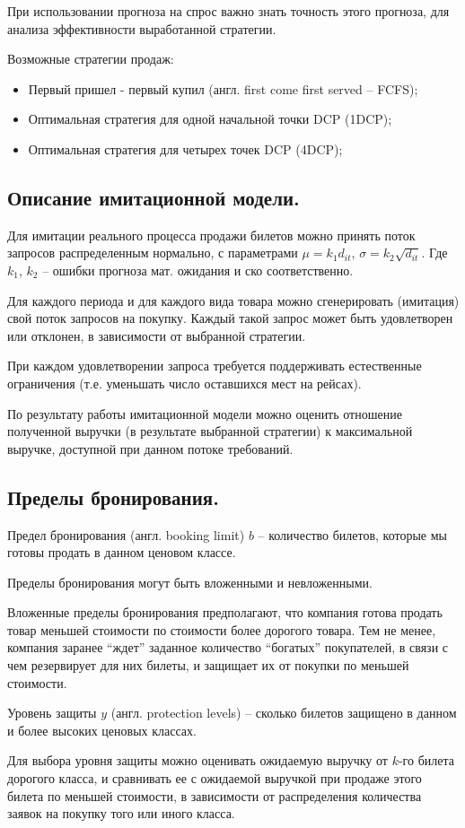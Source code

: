 \documentclass[reqno]{article}
\theoremstyle{definition}
\theoremstyle{definition}
\theoremstyle{definition}
\theoremstyle{definition}
\theoremstyle{definition}
\theoremstyle{definition}
\theoremstyle{definition}
\theoremstyle{definition}
\theoremstyle{definition}
\begin{document}
		При использовании прогноза на спрос важно знать точность этого прогноза, для анализа эффективности выработанной стратегии.
		
		Возможные стратегии продаж:
		\begin{itemize}
			\item Первый пришел - первый купил (англ. first come first served -- FCFS);
			\item Оптимальная стратегия для одной начальной точки DCP (1DCP);
			\item Оптимальная стратегия для четырех точек DCP (4DCP);
		\end{itemize}
	
	
		\subsection{Описание имитационной модели.}
		
		
		Для имитации реального процесса продажи билетов можно принять поток запросов распределенным нормально, с параметрами $\mu = k_1 d_{i t}$, $\sigma = k_2 \sqrt{d_{i t}}$. Где $k_1$, $k_2$ -- ошибки прогноза мат. ожидания и ско соответственно.
		
		Для каждого периода и для каждого вида товара можно сгенерировать (имитация) свой поток запросов на покупку. Каждый такой запрос может быть удовлетворен или отклонен, в зависимости от выбранной стратегии.
		
		При каждом удовлетворении запроса требуется поддерживать естественные ограничения (т.е. уменьшать число оставшихся мест на рейсах).
		
		По результату работы имитационной модели можно оценить отношение полученной выручки (в результате выбранной стратегии) к максимальной выручке, доступной при данном потоке требований.
		
		
		\subsection{Пределы бронирования.}
		
		Предел бронирования (англ. booking limit) $b$ -- количество билетов, которые мы готовы продать в данном ценовом классе.
		
		Пределы бронирования могут быть вложенными и невложенными.
		
		Вложенные пределы бронирования предполагают, что компания готова продать товар меньшей стоимости по стоимости более дорогого товара. Тем не менее, компания заранее ``ждет'' заданное количество ``богатых'' покупателей, в связи с чем резервирует для них билеты, и защищает их от покупки по меньшей стоимости.
		
		Уровень защиты $y$ (англ. protection levels) -- сколько билетов защищено в данном и более высоких ценовых классах.
		
		Для выбора уровня защиты можно оценивать ожидаемую выручку от $k$-го билета дорогого класса, и сравнивать ее с ожидаемой выручкой при продаже этого билета по меньшей стоимости, в зависимости от распределения количества заявок на покупку того или иного класса.
		
\end{document}
